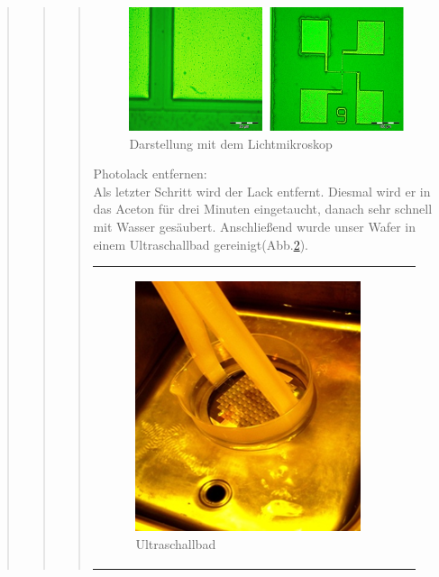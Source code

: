 \begin{quote}
\begin{quote}
\begin{quote}
    		\begin{figure}[H]
				\hspace{3 cm}
                  \includegraphics[scale=1, trim = 0cm 0cm 0cm 0cm,clip]
                	{./HerstellungBilder/Lichtmikroskopbilder4.png}
                  \caption{Darstellung mit dem Lichtmikroskop}
                \label{fig:darlicht}
            \end{figure}
            
    		\vspace{2em}
		
			Photolack entfernen:\\

			Als letzter Schritt wird der Lack entfernt. Diesmal wird er in das 
			Aceton für drei Minuten eingetaucht, danach sehr schnell mit Wasser 
			gesäubert. Anschließend wurde unser Wafer in einem Ultraschallbad 
			gereinigt(Abb.\ref{fig:ultra}).
			
			\vspace{2em}
    
    		\begin{center}
                \begin{tabular}{ll}

                \hspace{-14em}
                    \begin{minipage}{0.7\textwidth}
                        \begin{figure}[H]
                        \hspace{7.7em}
                            \includegraphics[scale=1, trim = 0cm 0cm 0cm
                            0cm, clip]{./HerstellungBilder/Ultraschalbad.png}
                            \caption{Ultraschallbad}
                           \label{fig:ultra}
                        \end{figure}


\end{minipage}
\end{tabular}
\end{center}
\end{quote}
\end{quote}
\end{quote}

